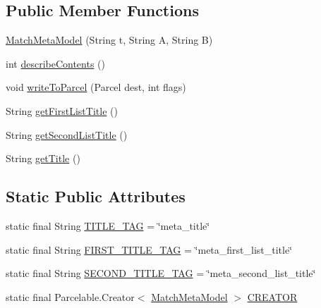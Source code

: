 \subsection*{Public Member Functions}
\begin{DoxyCompactItemize}
\item 
\hyperlink{classorg_1_1buildmlearn_1_1matchtemplate_1_1data_1_1MatchMetaModel_abeb31e4694d0799936d023712520a383}{Match\+Meta\+Model} (String t, String A, String B)
\item 
int \hyperlink{classorg_1_1buildmlearn_1_1matchtemplate_1_1data_1_1MatchMetaModel_a63874779b8b3b2f510f5a3a7c273234e}{describe\+Contents} ()
\item 
void \hyperlink{classorg_1_1buildmlearn_1_1matchtemplate_1_1data_1_1MatchMetaModel_a798155da76eae4503f951f7ff8f7eb75}{write\+To\+Parcel} (Parcel dest, int flags)
\item 
String \hyperlink{classorg_1_1buildmlearn_1_1matchtemplate_1_1data_1_1MatchMetaModel_affcda438d8d58e08c26c597cea1d2b23}{get\+First\+List\+Title} ()
\item 
String \hyperlink{classorg_1_1buildmlearn_1_1matchtemplate_1_1data_1_1MatchMetaModel_a00a7a88a9d099d1119d55c80bc17a4a6}{get\+Second\+List\+Title} ()
\item 
String \hyperlink{classorg_1_1buildmlearn_1_1matchtemplate_1_1data_1_1MatchMetaModel_ae52a2fab44e1b1ec1ff404b6d80ccfe0}{get\+Title} ()
\end{DoxyCompactItemize}
\subsection*{Static Public Attributes}
\begin{DoxyCompactItemize}
\item 
static final String \hyperlink{classorg_1_1buildmlearn_1_1matchtemplate_1_1data_1_1MatchMetaModel_af9280ec17d2a080ab8774a5973cf1ff4}{T\+I\+T\+L\+E\+\_\+\+T\+AG} = \char`\"{}meta\+\_\+title\char`\"{}
\item 
static final String \hyperlink{classorg_1_1buildmlearn_1_1matchtemplate_1_1data_1_1MatchMetaModel_a3fc3f36d3914ee4a219308582e8d0c85}{F\+I\+R\+S\+T\+\_\+\+T\+I\+T\+L\+E\+\_\+\+T\+AG} = \char`\"{}meta\+\_\+first\+\_\+list\+\_\+title\char`\"{}
\item 
static final String \hyperlink{classorg_1_1buildmlearn_1_1matchtemplate_1_1data_1_1MatchMetaModel_a88c0808700634d3d0266a78f54f192a9}{S\+E\+C\+O\+N\+D\+\_\+\+T\+I\+T\+L\+E\+\_\+\+T\+AG} = \char`\"{}meta\+\_\+second\+\_\+list\+\_\+title\char`\"{}
\item 
static final Parcelable.\+Creator$<$ \hyperlink{classorg_1_1buildmlearn_1_1matchtemplate_1_1data_1_1MatchMetaModel}{Match\+Meta\+Model} $>$ \hyperlink{classorg_1_1buildmlearn_1_1matchtemplate_1_1data_1_1MatchMetaModel_a4a726989c547dce464966d1c9f7682f5}{C\+R\+E\+A\+T\+OR}
\end{DoxyCompactItemize}
